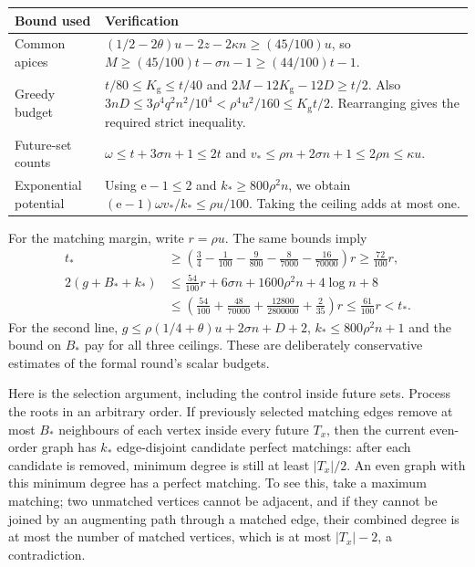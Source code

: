 \documentclass[english,11pt,a4paper]{article}
\begin{document}
{\begin{longtable}[]{@{}
  >{\raggedright\arraybackslash}p{}
  >{\raggedright\arraybackslash}p{}@{}}
\toprule\noalign{}
\begin{minipage}[b]{\linewidth}\raggedright
Bound used
\end{minipage} & \begin{minipage}[b]{\linewidth}\raggedright
Verification
\end{minipage} \\
\midrule\noalign{}
\endhead
\bottomrule\noalign{}
\endlastfoot
Common apices & \((1/2-2\theta)u-2z-2\kappa n\ge(45/100)u\), so \(M\ge(45/100)t-\sigma n-1\ge(44/100)t-1\). \\
Greedy budget & \(t/80\le K_{\mathrm g}\le t/40\) and \(2M-12K_{\mathrm g}-12D\ge t/2\). Also \(3nD\le3\rho^4q^2n^2/10^4<\rho^4u^2/160\le K_{\mathrm g}t/2\). Rearranging gives the required strict inequality. \\
Future-set counts & \(\omega\le t+3\sigma n+1\le2t\) and \(v_*\le\rho n+2\sigma n+1\le2\rho n\le\kappa u\). \\
Exponential potential & Using \(\mathrm e-1\le2\) and \(k_*\ge800\rho^2n\), we obtain \((\mathrm e-1)\omega v_*/k_*\le\rho u/100\). Taking the ceiling adds at most one. \\
\end{longtable}
}

For the matching margin, write \(r=\rho u\). The same bounds imply \[\begin{aligned}
t_*&\ge\left(\frac34-\frac1{100}-\frac9{800}-\frac8{7000}-\frac{16}{70000}\right)r
\ge\frac{72}{100}r,\\
2(g+B_*+k_*)&\le\frac{54}{100}r+6\sigma n+1600\rho^2n+4\log n+8\\
&\le\left(\frac{54}{100}+\frac{48}{70000}+\frac{12800}{2800000}+\frac2{35}\right)r
\le\frac{61}{100}r<t_*.
\end{aligned}\] For the second line, \(g\le\rho(1/4+\theta)u+2\sigma n+D+2\), \(k_*\le800\rho^2n+1\) and the bound on \(B_*\) pay for all three ceilings. These are deliberately conservative estimates of the formal round's scalar budgets.

Here is the selection argument, including the control inside future sets. Process the roots in an arbitrary order. If previously selected matching edges remove at most \(B_*\) neighbours of each vertex inside every future \(T_x\), then the current even-order graph has \(k_*\) edge-disjoint candidate perfect matchings: after each candidate is removed, minimum degree is still at least \(|T_x|/2\). An even graph with this minimum degree has a perfect matching. To see this, take a maximum matching; two unmatched vertices cannot be adjacent, and if they cannot be joined by an augmenting path through a matched edge, their combined degree is at most the number of matched vertices, which is at most \(|T_x|-2\), a contradiction.
\end{document}
